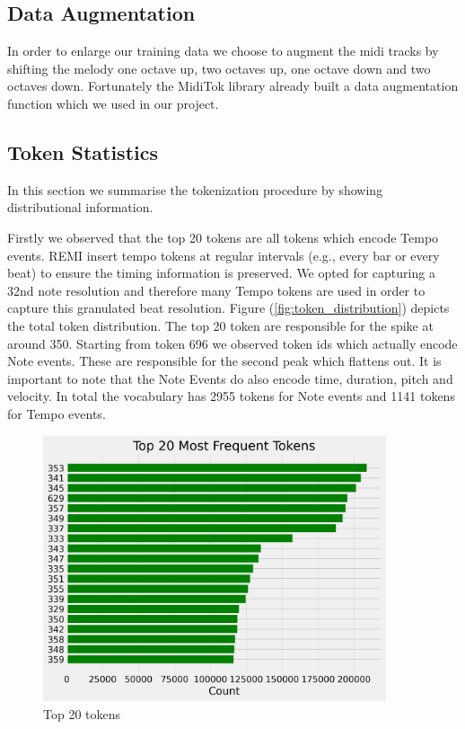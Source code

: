 \documentclass[a4paper,12pt]{extarticle}
\begin{document}
\subsection{Data Augmentation}
In order to enlarge our training data we choose to augment the midi tracks by shifting the melody one octave up, two octaves up, one octave down and two octaves down. Fortunately the MidiTok library already built a data augmentation function which we used in our project.
\subsection{Token Statistics}
\label{sec:token_stats}
In this section we summarise the tokenization procedure by showing distributional information.

Firstly we observed that the top 20 tokens are all tokens which encode Tempo events.
REMI insert tempo tokens at regular intervals (e.g., every bar or every beat) to ensure the timing information is preserved.
We opted for capturing a 32nd note resolution and therefore many Tempo tokens are used in order to capture this granulated beat resolution.
Figure (\ref{fig:token_distribution}) depicts the total token distribution. The top 20 token are responsible for the spike at around 350. Starting from token 696 we observed token ids which actually encode Note events. These are responsible for the second peak which flattens out.
It is important to note that the Note Events do also encode time, duration, pitch and velocity. In total the vocabulary has 2955 tokens for Note events and 1141 tokens for Tempo events.
\begin{figure}[H]
    \centering
    \includegraphics[width=0.9\textwidth]{visualization_4096_REMI_train_manual_tokens_True_random_padding_True_top_frequent_tokens.png}
    \caption{Top 20 tokens}
    \label{fig:top_20_tokens}
\end{figure}
\end{document}
